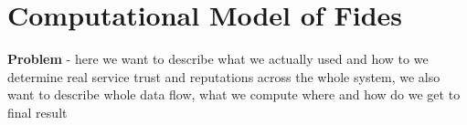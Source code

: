 \section{Computational Model of Fides}
\label{sec:computational-model}
\textbf{Problem} - here we want to describe what we actually used and how to we determine real service trust and reputations across  the whole system, we also want to describe whole data flow, what we compute where and how do we get to final result